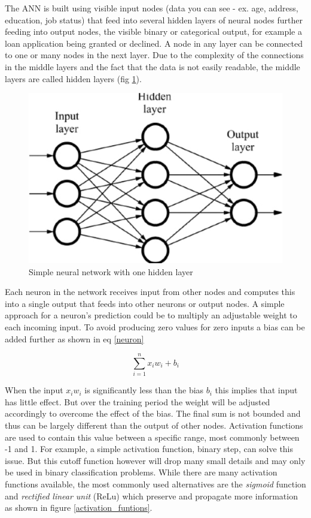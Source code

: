 \documentclass[proposal]{softeng}
\begin{document}
The ANN is built using visible input nodes (data you can see - ex. age, address, education, job status) that feed into several hidden layers of neural nodes further feeding into output nodes, the visible binary or categorical output, for example a loan application being granted or declined. A node in any layer can be connected to one or many  nodes in the next layer. Due to the complexity of the connections in the middle layers and the fact that the data is not easily readable, the middle layers are called hidden layers (fig \ref{fig:simplenetwork}).

\begin{figure}[h!]
\centering
  \includegraphics[scale=0.4]{images/simple-neural-network.jpg}
  \caption{Simple neural network with one hidden layer \cite{simpleneural}}
  \label{fig:simplenetwork}
\end{figure}

Each neuron in the network receives input from other nodes and computes this into a single output that feeds into other neurons or output nodes. A simple approach for a neuron's prediction could be to multiply an adjustable weight to each incoming input. To avoid producing zero values for zero inputs a bias can be added further as shown in eq  \ref{neuron}

\begin{equation}
\label{neuron}
 \sum_{i=1}^{n} {x_{i}} {w_{i}} + {b_{i}}  
\end{equation}



When the input \( {x_{i}} {w_{i}} \) is significantly less than the bias \({b_{i}}\) this implies that input has little effect. But over the training period the weight will be adjusted accordingly to overcome the effect of the bias. The final sum is not bounded and thus can be largely different than the output of other nodes. Activation functions are used to contain this value between a specific range, most commonly between -1 and 1. For example, a simple activation function, binary step, can solve this issue. But this cutoff function however will drop many small details and may only be used in binary classification problems. While there are many activation functions available, the most commonly used alternatives are the \textit{sigmoid} function and \textit{rectified linear unit} (ReLu) which preserve and propagate more information as shown in figure \ref{activation_funtions}. 
\end{document}
